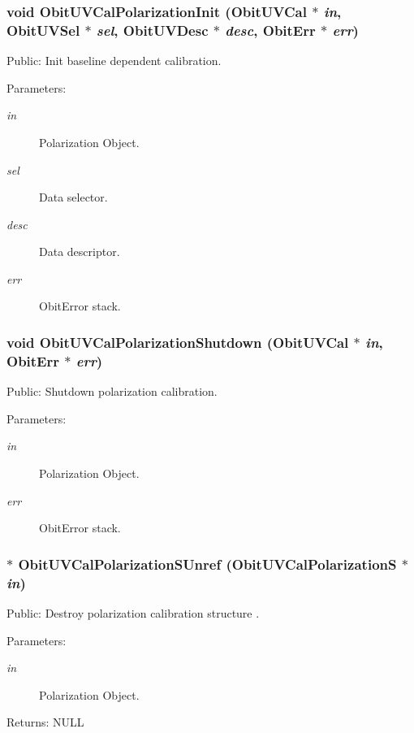 \subsubsection{\setlength{\rightskip}{0pt plus 5cm}void Obit\-UVCal\-Polarization\-Init ({\bf Obit\-UVCal} $\ast$ {\em in}, {\bf Obit\-UVSel} $\ast$ {\em sel}, {\bf Obit\-UVDesc} $\ast$ {\em desc}, {\bf Obit\-Err} $\ast$ {\em err})}\label{ObitUVCalPolarization_8c_a7}


Public: Init baseline dependent calibration. 

\begin{Desc}
\item[Parameters:]
\begin{description}
\item[{\em in}]Polarization Object. \item[{\em sel}]Data selector. \item[{\em desc}]Data descriptor. \item[{\em err}]Obit\-Error stack. \end{description}
\end{Desc}
\subsubsection{\setlength{\rightskip}{0pt plus 5cm}void Obit\-UVCal\-Polarization\-Shutdown ({\bf Obit\-UVCal} $\ast$ {\em in}, {\bf Obit\-Err} $\ast$ {\em err})}\label{ObitUVCalPolarization_8c_a9}


Public: Shutdown polarization calibration. 

\begin{Desc}
\item[Parameters:]
\begin{description}
\item[{\em in}]Polarization Object. \item[{\em err}]Obit\-Error stack. \end{description}
\end{Desc}
\subsubsection{$\ast$ Obit\-UVCal\-Polarization\-SUnref ({\bf Obit\-UVCal\-Polarization\-S} $\ast$ {\em in})}\label{ObitUVCalPolarization_8c_a10}


Public: Destroy polarization calibration structure . 

\begin{Desc}
\item[Parameters:]
\begin{description}
\item[{\em in}]Polarization Object. \end{description}
\end{Desc}
\begin{Desc}
\item[Returns:]NULL \end{Desc}
